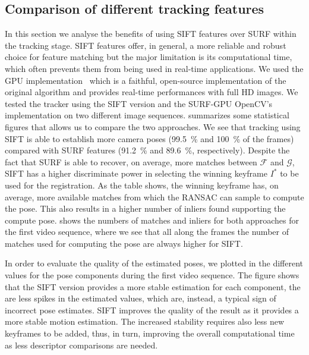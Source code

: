 \subsection{Comparison of different tracking features}
\label{sec:siftvssurf}
In this section we analyse the benefits of using SIFT features over SURF within the tracking stage. SIFT features offer, in general, a more reliable and robust choice for feature matching but the major limitation is its computational time, which often prevents them from being used in real-time applications.
We used the GPU implementation~\cite{Griwodz2018Popsift} which is a faithful, open-source implementation of the original algorithm and provides real-time performances with full HD images.
We tested the tracker using the SIFT version and the SURF-GPU OpenCV's implementation on two different image sequences.   summarizes some statistical figures that allows us to compare the two approaches. We see that tracking using SIFT is able to establish more camera poses (\SI{99.5}{\percent} and \SI{100}{\percent} of the frames) compared with SURF features (\SI{91.2}{\percent} and \SI{89.6}{\percent}, respectively).
Despite the fact that SURF is able to recover, on average, more matches between $\mathcal{F}$ and $\mathcal{G}$, SIFT has a higher discriminate power in selecting the winning keyframe $I^*$ to be used for the registration. As the table shows, the winning keyframe has, on average, more available matches from which the RANSAC can sample to compute the pose. This also results in a higher number of inliers found supporting the compute pose.
 shows the numbers of matches and inliers for both approaches for the first video sequence, where we see that all along the frames the number of matches used for computing the pose are always higher for SIFT. 

In order to evaluate the quality of the estimated poses, we plotted in  the different values for the pose components during the first video sequence. The figure shows that the SIFT version provides a more stable estimation for each component, \ie the are less spikes in the estimated values, which are, instead, a typical sign of incorrect pose estimates. SIFT improves the quality of the result as it provides a more stable motion estimation. The increased stability requires also less new keyframes to be added, thus, in turn, improving the overall computational time as less descriptor comparisons are needed. 

